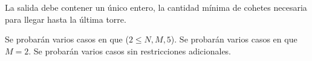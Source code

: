\documentclass{oci}
\begin{document}
\begin{outputDescription}
  La salida debe contener un único entero, la cantidad mínima de cohetes necesaria para llegar hasta la última torre.
\end{outputDescription}

\begin{scoreDescription}
  Se probarán varios casos en que ($2 \leq N, M, 5$).
  Se probarán varios casos en que $M=2$.
  Se probarán varios casos sin restricciones adicionales.
\end{scoreDescription}

\begin{sampleDescription}
\end{sampleDescription}
\end{document}
